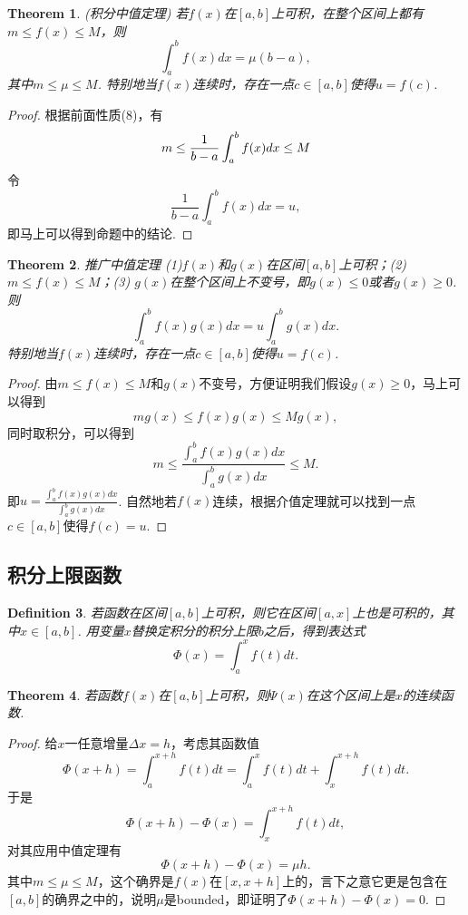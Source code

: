 \documentclass{article}
\newtheorem{theorem}{Theorem}[section]
\newtheorem{definition}[theorem]{Definition}
\begin{document}
\begin{theorem}
\rm {\color{red} (积分中值定理) } 若$f(x)$在$[a,b]$上可积，在整个区间上都有$m \leq f(x) \leq M$，则
$$
\int_a^b f(x)dx = \mu(b-a),
$$
其中$m\leq \mu \leq M$. 特别地当$f(x)$连续时，存在一点$c\in [a,b]$使得$u=f(c)$.  
\end{theorem}

\begin{proof}
根据前面性质(8)，有
$$
m \leq \frac{1}{b-a}\int_a^b f(x)dx \leq M \\
$$
令
$$
\frac{1}{b-a}\int_a^b f(x)dx = u,
$$
即马上可以得到命题中的结论.
\end{proof}

\begin{theorem}
\rm {\color{red} 推广中值定理} (1)$f(x)$和$g(x)$在区间$[a,b]$上可积；(2)$m\leq f(x) \leq M$；(3) $g(x)$在整个区间上不变号，即$g(x) \leq 0$或者$g(x) \geq 0$. 则
$$
\int_a^b f(x)g(x)dx = u\int_a^b g(x)dx.
$$
特别地当$f(x)$连续时，存在一点$c\in [a,b]$使得$u=f(c)$.  
\end{theorem}

\begin{proof}
由$m \leq f(x) \leq M$和$g(x)$不变号，方便证明我们假设$g(x) \geq 0$，马上可以得到
$$
mg(x) \leq f(x)g(x) \leq Mg(x),
$$
同时取积分，可以得到
$$
m \leq \frac{\int_a^b f(x)g(x)dx}{\int_a^b g(x)dx} \leq M.
$$
即$u = \frac{\int_a^b f(x)g(x)dx}{\int_a^b g(x)dx}$. 自然地若$f(x)$连续，根据介值定理就可以找到一点$c \in [a,b]$使得$f(c) = u$.
\end{proof}

\subsection{积分上限函数}

\begin{definition}
\rm 若函数在区间$[a,b]$上可积，则它在区间$[a,x]$上也是可积的，其中$x \in [a,b]$. 用变量$x$替换定积分的积分上限$b$之后，得到表达式
$$
\Phi(x) = \int_a^x f(t)dt.
$$
\end{definition}

\begin{theorem}
\rm 若函数$f(x)$在$[a,b]$上可积，则$\Psi(x)$在这个区间上是$x$的连续函数.
\end{theorem}

\begin{proof}
给$x$一任意增量$\Delta x = h$，考虑其函数值
$$
\Phi(x+h) = \int_a^{x+h} f(t)dt = \int_a^x f(t)dt  + \int_x^{x+h} f(t)dt.
$$
于是
$$
\Phi(x+h) - \Phi(x) = \int_x^{x+h} f(t)dt,
$$
对其应用中值定理有
$$
\Phi(x+h) - \Phi(x)  = \mu h.
$$
其中$m \leq \mu \leq M$，这个确界是$f(x)$在$[x,x+h]$上的，言下之意它更是包含在$[a,b]$的确界之中的，说明$\mu$是bounded，即证明了$\Phi(x+h) - \Phi(x) = 0$.
\end{proof}
\end{document}
